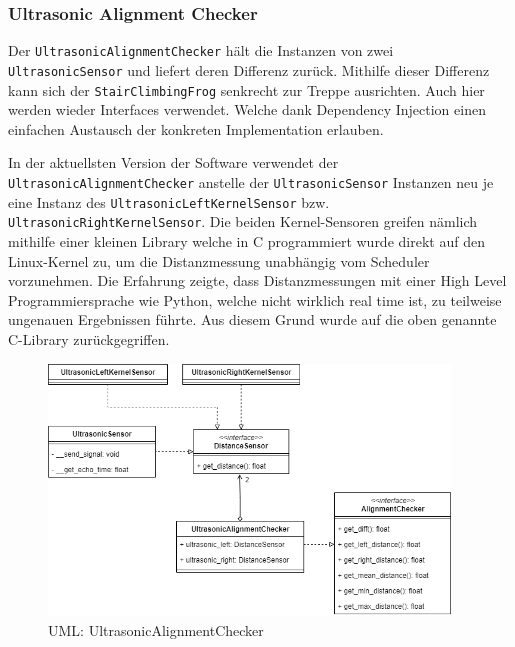 \newpage

\subsubsection{Ultrasonic Alignment Checker}
\label{subsec:ultrasonic-alignment-checker}
Der \texttt{UltrasonicAlignmentChecker} hält die Instanzen von zwei \texttt{UltrasonicSensor} und liefert deren Differenz zurück. Mithilfe dieser Differenz kann sich der \texttt{StairClimbingFrog} senkrecht zur Treppe ausrichten. Auch hier werden wieder Interfaces verwendet. Welche dank Dependency Injection einen einfachen Austausch der konkreten Implementation erlauben.

In der aktuellsten Version der Software verwendet der \texttt{UltrasonicAlignmentChecker} anstelle der \texttt{UltrasonicSensor} Instanzen neu je eine Instanz des \texttt{UltrasonicLeftKernelSensor} bzw. \texttt{UltrasonicRightKernelSensor}. Die beiden Kernel-Sensoren greifen nämlich mithilfe einer kleinen Library \cite{linux-hc-sro4} welche in C programmiert wurde direkt auf den Linux-Kernel zu, um die Distanzmessung unabhängig vom Scheduler vorzunehmen. Die Erfahrung zeigte, dass Distanzmessungen mit einer High Level Programmiersprache wie Python, welche nicht wirklich real time ist, zu teilweise ungenauen Ergebnissen führte. Aus diesem Grund wurde auf die oben genannte C-Library zurückgegriffen.

\begin{figure}[H]
  \includegraphics[width=0.95\textwidth]{img/softwarearchitektur/UML-UltrasonicAlignmentChecker.png}
  \centering
  \caption{UML: UltrasonicAlignmentChecker}
  \label{fig:uml-ultrasonic-alignment-checker}
\end{figure}

\newpage

